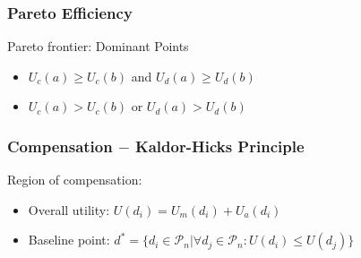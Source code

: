 \documentclass[14pt]{beamer}
\begin{document}
\begin{frame}\frametitle{Pareto Efficiency}

Pareto frontier: Dominant Points

\begin{itemize}
\item $U_c(a)\ge U_c(b)$ and $U_d(a)\ge U_d(b)$
\item $U_c(a) > U_c(b)$ or $U_d(a) > U_d(b)$
\end{itemize}



\end{frame}

\begin{frame}\frametitle{Compensation $-$ Kaldor-Hicks Principle}

Region of compensation:

\begin{itemize}
\item Overall utility: $U(d_i)=U_m(d_i)+U_a(d_i)$
\item Baseline point: $d^*=\{d_i\in\mathcal{P}_n | \forall d_j\in\mathcal{P}_n: U(d_i)\leq U(d_j)\}$
\end{itemize}



\end{frame}
\end{document}
